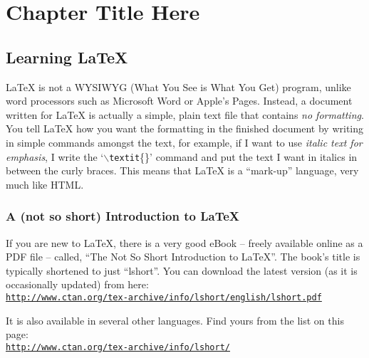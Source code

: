 
\chapter{Chapter Title Here} %

\label{Chapter1} %



\section{Learning \LaTeX{}}

\LaTeX{} is not a WYSIWYG (What You See is What You Get) program, unlike word processors such as Microsoft Word or Apple's Pages. Instead, a document written for \LaTeX{} is actually a simple, plain text file that contains \emph{no formatting}. You tell \LaTeX{} how you want the formatting in the finished document by writing in simple commands amongst the text, for example, if I want to use \textit{italic text for emphasis}, I write the `$\backslash$\texttt{textit}\{\}' command and put the text I want in italics in between the curly braces. This means that \LaTeX{} is a ``mark-up'' language, very much like HTML.

\subsection{A (not so short) Introduction to \LaTeX{}}

If you are new to \LaTeX{}, there is a very good eBook -- freely available online as a PDF file -- called, ``The Not So Short Introduction to \LaTeX{}''. The book's title is typically shortened to just ``lshort''. You can download the latest version (as it is occasionally updated) from here:\\
\href{http://www.ctan.org/tex-archive/info/lshort/english/lshort.pdf}{\texttt{http://www.ctan.org/tex-archive/info/lshort/english/lshort.pdf}}

It is also available in several other languages. Find yours from the list on this page:\\
\href{http://www.ctan.org/tex-archive/info/lshort/}{\texttt{http://www.ctan.org/tex-archive/info/lshort/}}

